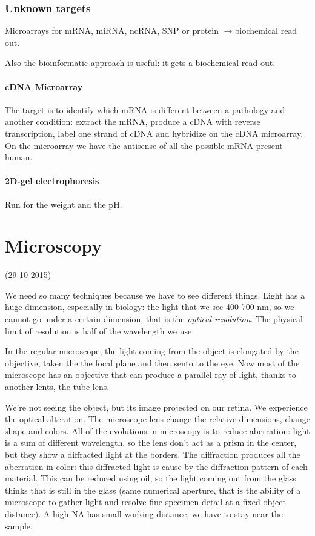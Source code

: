 \documentclass[a4paper, 12pt]{book}
\newcommand{\lfreccia}{\ensuremath{\longrightarrow}}
\begin{document}
\subsection{Unknown targets}
Microarrays for mRNA, miRNA, ncRNA, SNP or protein \lfreccia biochemical read out.

Also the bioinformatic approach is useful: it gets a biochemical read out.

\subsubsection{cDNA Microarray}
The target is to identify which mRNA is different between a pathology and another condition: extract the mRNA, produce a cDNA with reverse transcription, label one strand of cDNA and hybridize on the cDNA microarray. On the microarray we have the antisense of all the possible mRNA present human. 

\subsubsection{2D-gel electrophoresis}
Run for the weight and the pH. 

\chapter{Microscopy}
(29-10-2015)

We need so many techniques because we have to see different things. Light has a huge dimension, especially in biology: the light that we see 400-700 nm, so we cannot go under a certain dimension, that is the \emph{optical resolution}. The physical limit of resolution is half of the wavelength we use. 

In the regular microscope, the light coming from the object is elongated by the objective, taken the the focal plane and then sento to the eye. Now most of the microscope has an objective that can produce a parallel ray of light, thanks to another lents, the tube lens. 

We're not seeing the object, but its image projected on our retina. We experience the optical alteration. The microscope lens change the relative dimensions, change shape and colors.
All of the evolutions in microscopy is to reduce aberration: light is a sum of different wavelength, so the lens don't act as a prism in the center, but they show a diffracted light at the borders. The diffraction produces all the aberration in color: this diffracted light is cause by the diffraction pattern of each material. This can be reduced using oil, so the light coming out from the glass thinks that is still in the glass (same numerical aperture, that is the ability of a microscope to gather light and resolve fine specimen detail at a fixed object distance). A high NA has small working distance, we have to stay near the sample.
\end{document}
